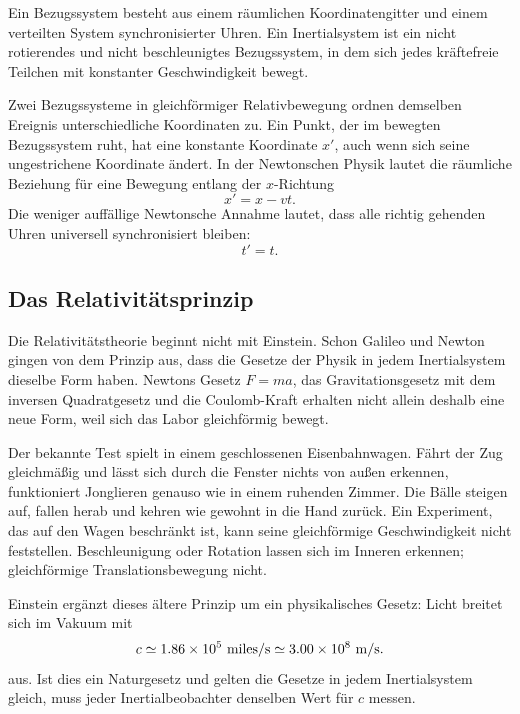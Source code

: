 \begin{definition}
Ein Bezugssystem besteht aus einem räumlichen Koordinatengitter und einem verteilten System synchronisierter Uhren. Ein Inertialsystem ist ein nicht rotierendes und nicht beschleunigtes Bezugssystem, in dem sich jedes kräftefreie Teilchen mit konstanter Geschwindigkeit bewegt.
\end{definition}

Zwei Bezugssysteme in gleichförmiger Relativbewegung ordnen demselben Ereignis unterschiedliche Koordinaten zu. Ein Punkt, der im bewegten Bezugssystem ruht, hat eine konstante Koordinate \(x'\), auch wenn sich seine ungestrichene Koordinate ändert. In der Newtonschen Physik lautet die räumliche Beziehung für eine Bewegung entlang der \(x\)-Richtung
\begin{equation}
x'=x-vt.
\label{eq:sr1-galilean-space}
\end{equation}
Die weniger auffällige Newtonsche Annahme lautet, dass alle richtig gehenden Uhren universell synchronisiert bleiben:
\begin{equation}
t'=t.
\label{eq:sr1-absolute-time}
\end{equation}

\subsection{Das Relativitätsprinzip}

Die Relativitätstheorie beginnt nicht mit Einstein. Schon Galileo und Newton gingen von dem Prinzip aus, dass die Gesetze der Physik in jedem Inertialsystem dieselbe Form haben. Newtons Gesetz \(F=ma\), das Gravitationsgesetz mit dem inversen Quadratgesetz und die Coulomb-Kraft erhalten nicht allein deshalb eine neue Form, weil sich das Labor gleichförmig bewegt.

Der bekannte Test spielt in einem geschlossenen Eisenbahnwagen. Fährt der Zug gleichmäßig und lässt sich durch die Fenster nichts von außen erkennen, funktioniert Jonglieren genauso wie in einem ruhenden Zimmer. Die Bälle steigen auf, fallen herab und kehren wie gewohnt in die Hand zurück. Ein Experiment, das auf den Wagen beschränkt ist, kann seine gleichförmige Geschwindigkeit nicht feststellen. Beschleunigung oder Rotation lassen sich im Inneren erkennen; gleichförmige Translationsbewegung nicht.

Einstein ergänzt dieses ältere Prinzip um ein physikalisches Gesetz: Licht breitet sich im Vakuum mit
\begin{equation}
c \simeq 1.86\times 10^5\ {\rm miles/s}
   \simeq 3.00\times 10^8\ {\rm m/s}.
\end{equation}
aus. Ist dies ein Naturgesetz und gelten die Gesetze in jedem Inertialsystem gleich, muss jeder Inertialbeobachter denselben Wert für \(c\) messen.

